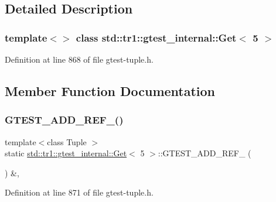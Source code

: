 \subsection{Detailed Description}
\subsubsection*{template$<$$>$\newline
class std\+::tr1\+::gtest\+\_\+internal\+::\+Get$<$ 5 $>$}



Definition at line 868 of file gtest-\/tuple.\+h.



\subsection{Member Function Documentation}
\mbox{\label{classstd_1_1tr1_1_1gtest__internal_1_1Get_3_015_01_4_a0a337088bab3f824f67d1607229fdcc2}} 
\subsubsection{\texorpdfstring{G\+T\+E\+S\+T\+\_\+\+A\+D\+D\+\_\+\+R\+E\+F\+\_\+()}{GTEST\_ADD\_REF\_()}}
{\footnotesize\ttfamily template$<$class Tuple $>$ \\
static \hyperlink{classstd_1_1tr1_1_1gtest__internal_1_1Get}{std\+::tr1\+::gtest\+\_\+internal\+::\+Get}$<$ 5 $>$\+::G\+T\+E\+S\+T\+\_\+\+A\+D\+D\+\_\+\+R\+E\+F\+\_\+ (\begin{DoxyParamCaption}\item[{\hyperlink{gtest-tuple_8h_a1b7f133d8aa02e0b7afed7b66781eeb7}{G\+T\+E\+S\+T\+\_\+\+T\+U\+P\+L\+E\+\_\+\+E\+L\+E\+M\+E\+N\+T\+\_\+}(5, Tuple)}]{ }\end{DoxyParamCaption}) \&\hspace{0.3cm}{\ttfamily [inline]}, {\ttfamily [static]}}



Definition at line 871 of file gtest-\/tuple.\+h.


